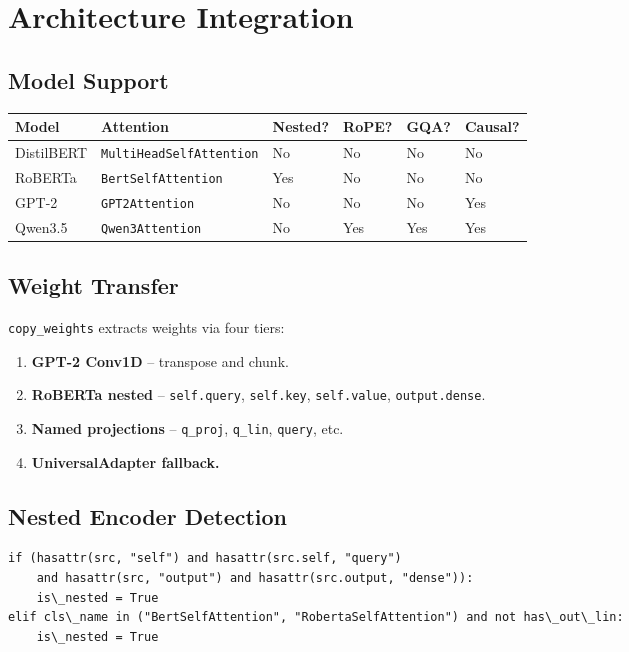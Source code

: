 \section{Architecture Integration}

\subsection{Model Support}

\begin{table}[H]
\centering
\small
\begin{tabular}{llllll}
\toprule
\textbf{Model} & \textbf{Attention} & \textbf{Nested?} & \textbf{RoPE?} & \textbf{GQA?} & \textbf{Causal?} \\
\midrule
DistilBERT & \texttt{MultiHeadSelfAttention} & No & No & No & No \\
RoBERTa & \texttt{BertSelfAttention} & Yes & No & No & No \\
GPT-2 & \texttt{GPT2Attention} & No & No & No & Yes \\
Qwen3.5 & \texttt{Qwen3Attention} & No & Yes & Yes & Yes \\
\bottomrule
\end{tabular}
\end{table}

\subsection{Weight Transfer}

\texttt{copy\_weights} extracts weights via four tiers:

\begin{enumerate}
\item \textbf{GPT-2 Conv1D} -- transpose and chunk.
\item \textbf{RoBERTa nested} -- \texttt{self.query}, \texttt{self.key}, \texttt{self.value}, \texttt{output.dense}.
\item \textbf{Named projections} -- \texttt{q\_proj}, \texttt{q\_lin}, \texttt{query}, etc.
\item \textbf{UniversalAdapter fallback.}

\end{enumerate}
\subsection{Nested Encoder Detection}

\begin{lstlisting}
if (hasattr(src, "self") and hasattr(src.self, "query")
    and hasattr(src, "output") and hasattr(src.output, "dense")):
    is\_nested = True
elif cls\_name in ("BertSelfAttention", "RobertaSelfAttention") and not has\_out\_lin:
    is\_nested = True
\end{lstlisting}


